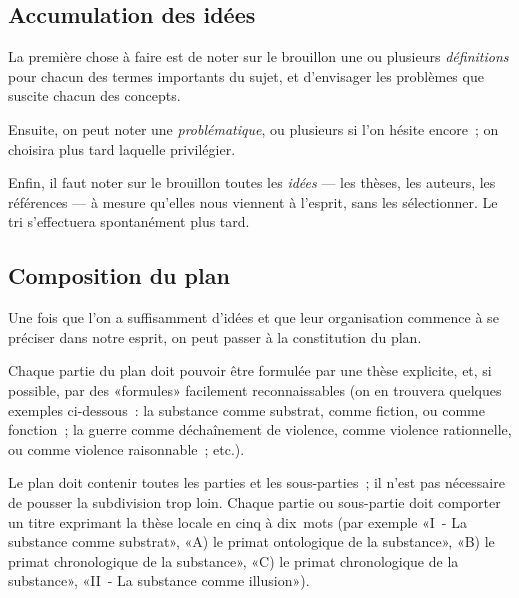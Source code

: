 \documentclass[a4paper,11pt]{article}
\begin{document}
\par

\subsection{Accumulation des idées}

La première chose à faire est de noter sur le brouillon une ou plusieurs
\emph{définitions} pour chacun des termes importants du sujet, et
d'envisager les problèmes que suscite chacun des concepts.

\par

Ensuite, on peut noter une \emph{problématique}, ou plusieurs si l'on
hésite encore~; on choisira plus tard laquelle privilégier.

\par

Enfin, il faut noter sur le brouillon toutes les \emph{idées} --- les
thèses, les auteurs, les références --- à mesure qu'elles nous viennent
à l'esprit, sans les sélectionner. Le tri s'effectuera spontanément plus
tard.

\par

\subsection{Composition du plan}

Une fois que l'on a suffisamment d'idées et que leur organisation
commence à se préciser dans notre esprit, on peut passer à la
constitution du plan. 

\par

Chaque partie du plan doit pouvoir être formulée par une thèse
explicite, et, si possible, par des «formules» facilement
reconnaissables (on en trouvera quelques exemples ci-dessous~: la
substance comme substrat, comme fiction, ou comme fonction~; la guerre
comme déchaînement de violence, comme violence rationnelle, ou comme
violence raisonnable~; etc.).

\par

Le plan doit contenir toutes les parties et les sous-parties~; il n'est
pas nécessaire de pousser la subdivision trop loin. Chaque partie ou
sous-partie doit comporter un titre exprimant la thèse locale en cinq à
dix~mots (par exemple «I~- La substance comme substrat», «A) le primat
ontologique de la substance», «B) le primat
chronologique de la substance», «C) le primat
chronologique de la substance», «II~- La substance comme illusion»).
\end{document}
